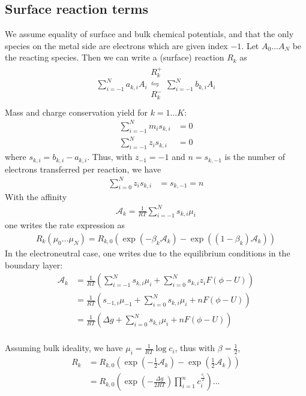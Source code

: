 \documentclass[12pt,oneside,reqno]{amsart}
\numberwithin{equation}{section}
\begin{document}
\subsection{Surface reaction terms}
We assume equality of surface and bulk chemical potentials, and that the only species on the metal
side are electrons which are given index $-1$.
Let $A_0\dots A_N$ be the reacting species. Then we can write a (surface) reaction $R_k$ as
\begin{align}
  \sum_{i=-1}^N a_{k,i} A_i
  \begin{array}{c}
     R_k^+\\
    \leftrightharpoons \\
     R_k^-\\
  \end{array}
  \sum_{i=-1}^N b_{k,i} A_i
\end{align}
Mass and charge conservation yield for $k=1\dots K$:
\begin{align}
  \sum_{i=-1}^N m_i s_{k,i}&=0\\
  \sum_{i=-1}^N z_i s_{k,i}&=0
\end{align}
where $s_{k,i}=b_{k,i}-a_{k,i}$.
Thus, with $z_{-1}=-1$ and $n=s_{k,-1}$ is the number of electrons
transferred per reaction, we have
\begin{align}
  \sum_{i=0}^N z_i s_{k,i}&=s_{k,-1}=n
\end{align}
With the affinity
\begin{align}
  \mathcal A_k = \frac{1}{RT}\sum_{i=-1}^Ns_{k,i}\mu_i
\end{align}
one writes the rate expression as
\begin{align}
  R_k(\mu_0\dots\mu_N)= R_{k,0}\left(\exp(-\beta_k\mathcal A_k) - \exp((1-\beta_k)\mathcal A_k)\right)
\end{align}
In the electroneutral case, one writes due to the equilibrium conditions in the boundary layer:
\begin{align}
  \mathcal A_k &= \frac{1}{RT}\left(\sum_{i=-1}^Ns_{k,i}\mu_i + \sum_{i=0}^Ns_{k,i}z_iF(\phi -U)\right)\\
               &= \frac{1}{RT}\left(s_{-1,i}\mu_{-1}+ \sum_{i=0}^Ns_{k,i}\mu_i + nF(\phi -U)\right)\\
               &= \frac{1}{RT}\left(\Delta g+ \sum_{i=0}^Ns_{k,i}\mu_i + nF(\phi -U)\right)\\
\end{align}

Assuming bulk ideality, we  have $\mu_i=\frac1{RT}\log c_i$, thus with $\beta=\frac12$,
\begin{align}
  R_k&= R_{k,0}\left(\exp(-\frac12\mathcal A_k) - \exp(\frac12\mathcal A_k)\right)\\
     &= R_{k,0}\left(\exp(-\frac{\Delta g}{2RT})\prod_{i=1}^nc_i^{\frac{s_i}{2}}\right)\dots
\end{align}
\end{document}
